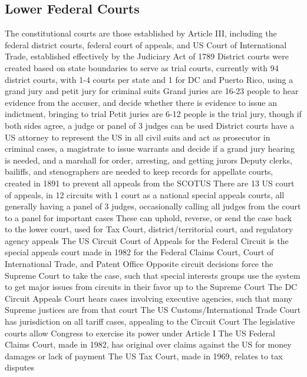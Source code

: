 \documentclass[11 pt, twoside]{article}
\newenvironment{outline*}
{
	\begin{outline}[enumerate]
	}
	{\end{outline}
}
\begin{document}
\subsection{Lower Federal Courts}
\begin{outline*}
\1 The constitutional courts are those established by Article III, including the federal district courts, federal court of appeals, and US Court of International Trade, established effectively by the Judiciary Act of 1789
\2 District courts were created based on state boundaries to serve as trial courts, currently with 94 district courts, with 1-4 courts per state and 1 for DC and Puerto Rico, using a grand jury and petit jury for criminal suits
\2 Grand juries are 16-23 people to hear evidence from the accuser, and decide whether there is evidence to issue an indictment, bringing to trial
\2 Petit juries are 6-12 people is the trial jury, though if both sides agree, a judge or panel of 3 judges can be used
\1 District courts have a US attorney to represent the US in all civil suits and act as prosecutor in criminal cases, a magistrate to issue warrants and decide if a grand jury hearing is needed, and a marshall for order, arresting, and getting jurors
\2 Deputy clerks, bailiffs, and stenographers are needed to keep records for appellate courts, created in 1891 to prevent all appeals from the SCOTUS
\1 There are 13 US court of appeals, in 12 circuits with 1 court as a national special appeals courts, all generally having a panel of 3 judges, occasionally calling all judges from the court to a panel for important cases
\2 These can uphold, reverse, or send the case back to the lower court, used for Tax Court, district/territorial court, and regulatory agency appeals
\2 The US Circuit Court of Appeals for the Federal Circuit is the special appeals court made in 1982 for the Federal Claims Court, Court of International Trade, and Patent Office
\2 Opposite circuit decisions force the Supreme Court to take the case, such that special interests groups use the system to get major issues from circuits in their favor up to the Supreme Court
\2 The DC Circuit Appeals Court hears cases involving executive agencies, such that many Supreme justices are from that court
\1 The US Customs/International Trade Court has jurisdiction on all tariff cases, appealing to the Circuit Court
\1 The legislative courts allow Congress to exercise its power under Article I
\1 The US Federal Claims Court, made in 1982, has original over claims against the US for money damages or lack of payment
\1 The US Tax Court, made in 1969, relates to tax disputes

\end{outline*}
\end{document}
